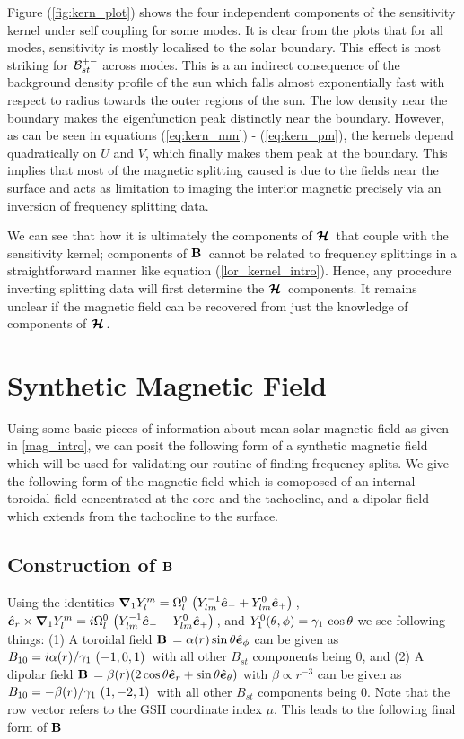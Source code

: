 Figure (\ref{fig:kern_plot}) shows the four independent components of the sensitivity kernel under self coupling for some modes. It is clear from the plots that for all modes, sensitivity is mostly localised to the solar boundary. This effect is most striking for $\mathcal{B}^{+-}_{st}$ across modes. This is a an indirect consequence of the background density profile of the sun which falls almost exponentially fast with respect to radius towards the outer regions of the sun. The low density near the boundary makes the eigenfunction peak distinctly near the boundary. However, as can be seen in equations (\ref{eq:kern_mm}) - (\ref{eq:kern_pm}), the kernels depend quadratically on $U$ and $V$, which finally makes them peak at the boundary. This implies that most of the magnetic splitting caused is due to the fields near the surface and acts as limitation to imaging the interior magnetic precisely via an inversion of frequency splitting data.

We can see that how it is ultimately the components of $\bm{\mathcal{H}}\,$ that couple with the sensitivity kernel; components of $\mathbf{B}\,$ cannot be related to frequency splittings in a straightforward manner like equation (\ref{lor_kernel_intro}). Hence, any procedure inverting splitting data will first determine the $\bm{\mathcal{H}}\,$ components. It remains unclear if the magnetic field can be recovered from just the knowledge of components of $\bm{\mathcal{H}}\,$.

\section{Synthetic Magnetic Field}
Using some basic pieces of information about mean solar magnetic field as given in \ref{mag_intro}, we can posit the following form of a synthetic magnetic field which will be used for validating our routine of finding frequency splits. We give the following form of the magnetic field which is comoposed of an internal toroidal field concentrated at the core and the tachocline, and a dipolar field which extends from the tachocline to the surface.

\subsection{Construction of $\mathbf{B}\,$}\label{sec:B_construction}
Using the identities $\bm{\nabla}_1 Y_l^m = \Omega_{l}^{0}\, \left( Y_{lm}^{-1} \hat{\bm{e}}_{-} + Y_{lm}^0 \hat{\bm{e}}_{+} \right)\,$, $\hat{\bm{e}}_{r} \times\bm{\nabla}_1 Y_l^m = i\Omega_{l}^{0}\, \left( Y_{lm}^{-1} \hat{\bm{e}}_{-} - Y_{lm}^0 \hat{\bm{e}}_{+} \right)\,$, and $Y_1^0(\theta,\phi) = \gamma_{1}\,\cos\theta$ we see following things: (1) A toroidal field $\mathbf{B}\, = \alpha(r) \sin\theta \hat{\bm{e}}_{\phi}$ can be given as $B_{10} = i \alpha(r) / \gamma_{1}\, \left( -1,0,1 \right)\,$ with all other $B_{st}$ components being $0$, and (2) A dipolar field $\mathbf{B}\, = \beta(r) (2\cos\theta \hat{\bm{e}}_{r} + \sin\theta\hat{\bm{e}}_{\theta})$ with $\beta \propto r^{-3}$ can be given as $B_{10} = -\beta(r)/\gamma_{1}\, \left( 1,-2,1 \right)\,$ with all other $B_{st}$ components being $0$. Note that the row vector refers to the GSH coordinate index $\mu$. This leads to the following final form of $\mathbf{B}\,$

